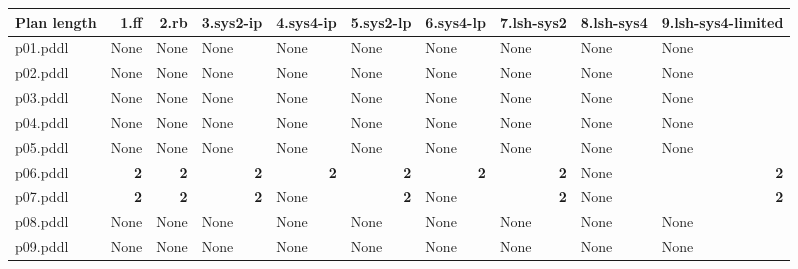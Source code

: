 \documentclass{article}
\begin{document}
\begin{tabular}{@{}lrrrrrrrrr@{}}
Plan length & 1.ff & 2.rb & 3.sys2-ip & 4.sys4-ip & 5.sys2-lp & 6.sys4-lp & 7.lsh-sys2 & 8.lsh-sys4 & 9.lsh-sys4-limited \\
\midrule
p01.pddl & \multicolumn{1}{|l|}{None} & \multicolumn{1}{|l|}{None} & \multicolumn{1}{|l|}{None} & \multicolumn{1}{|l|}{None} & \multicolumn{1}{|l|}{None} & \multicolumn{1}{|l|}{None} & \multicolumn{1}{|l|}{None} & \multicolumn{1}{|l|}{None} & \multicolumn{1}{|l|}{None} \\
p02.pddl & \multicolumn{1}{|l|}{None} & \multicolumn{1}{|l|}{None} & \multicolumn{1}{|l|}{None} & \multicolumn{1}{|l|}{None} & \multicolumn{1}{|l|}{None} & \multicolumn{1}{|l|}{None} & \multicolumn{1}{|l|}{None} & \multicolumn{1}{|l|}{None} & \multicolumn{1}{|l|}{None} \\
p03.pddl & \multicolumn{1}{|l|}{None} & \multicolumn{1}{|l|}{None} & \multicolumn{1}{|l|}{None} & \multicolumn{1}{|l|}{None} & \multicolumn{1}{|l|}{None} & \multicolumn{1}{|l|}{None} & \multicolumn{1}{|l|}{None} & \multicolumn{1}{|l|}{None} & \multicolumn{1}{|l|}{None} \\
p04.pddl & \multicolumn{1}{|l|}{None} & \multicolumn{1}{|l|}{None} & \multicolumn{1}{|l|}{None} & \multicolumn{1}{|l|}{None} & \multicolumn{1}{|l|}{None} & \multicolumn{1}{|l|}{None} & \multicolumn{1}{|l|}{None} & \multicolumn{1}{|l|}{None} & \multicolumn{1}{|l|}{None} \\
p05.pddl & \multicolumn{1}{|l|}{None} & \multicolumn{1}{|l|}{None} & \multicolumn{1}{|l|}{None} & \multicolumn{1}{|l|}{None} & \multicolumn{1}{|l|}{None} & \multicolumn{1}{|l|}{None} & \multicolumn{1}{|l|}{None} & \multicolumn{1}{|l|}{None} & \multicolumn{1}{|l|}{None} \\
p06.pddl & \textbf{2} & \textbf{2} & \textbf{2} & \textbf{2} & \textbf{2} & \textbf{2} & \textbf{2} & \multicolumn{1}{|l|}{None} & \textbf{2} \\
p07.pddl & \textbf{2} & \textbf{2} & \textbf{2} & \multicolumn{1}{|l|}{None} & \textbf{2} & \multicolumn{1}{|l|}{None} & \textbf{2} & \multicolumn{1}{|l|}{None} & \textbf{2} \\
p08.pddl & \multicolumn{1}{|l|}{None} & \multicolumn{1}{|l|}{None} & \multicolumn{1}{|l|}{None} & \multicolumn{1}{|l|}{None} & \multicolumn{1}{|l|}{None} & \multicolumn{1}{|l|}{None} & \multicolumn{1}{|l|}{None} & \multicolumn{1}{|l|}{None} & \multicolumn{1}{|l|}{None} \\
p09.pddl & \multicolumn{1}{|l|}{None} & \multicolumn{1}{|l|}{None} & \multicolumn{1}{|l|}{None} & \multicolumn{1}{|l|}{None} & \multicolumn{1}{|l|}{None} & \multicolumn{1}{|l|}{None} & \multicolumn{1}{|l|}{None} & \multicolumn{1}{|l|}{None} & \multicolumn{1}{|l|}{None} \\

\end{tabular}
\end{document}

